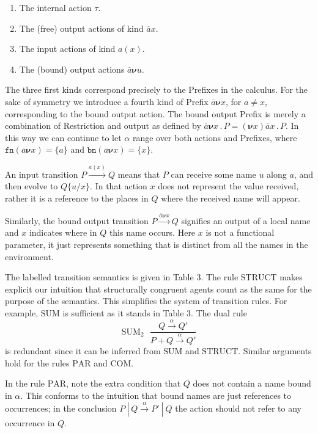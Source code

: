 \documentclass[10pt,a4paper]{article}
\newcommand{\resp}[1]{(\boldsymbol{\nu}#1)}
\newcommand{\res}[2]{\resp{#1}#2}
\newcommand{\outp}[2]{\overline{#1}#2}
\newcommand{\inpp}[2]{#1(#2)}
\newcommand{\silp}{\tau}
\newcommand{\prefix}[2]{{#1}\,.\,#2}
\newcommand{\boutp}[2]{\overline{#1}\boldsymbol{\nu}#2}
\newcommand{\out}[3]{\prefix{\outp{#1}{#2}}{#3}}
\newcommand{\bout}[3]{\prefix{\boutp{#1}{#2}}{#3}}
\newcommand{\para}{\:|\:}
\newcommand{\fn}{\texttt{fn}}
\newcommand{\bn}{\texttt{bn}}
\newcommand{\tran}[3]{#1 \overset{#2}{\longrightarrow} #3}
\newcommand{\rulname}[1]{\scriptstyle \text{#1}}
\newcommand{\rul}[3]{\rulname{#1} \:\:\: \displaystyle \frac{#2}{#3}}
\begin{document}
\begin{enumerate}

\item The internal action $\silp$.

\item The (free) output actions of kind $\outp{a}{x}$.

\item The input actions of kind $\inpp{a}{x}$.

\item The (bound) output actions $\boutp{a}{u}$.
  
\end{enumerate}

The three first kinds correspond precisely to the Prefixes in the calculus. For the sake of symmetry we introduce a fourth kind of Prefix $\boutp{a}{x}$, for $a \neq x$, corresponding to the bound output action. The bound output Prefix is merely a combination of Restriction and output as defined by $\bout{a}{x}{P} = \res{x}{\out{a}{x}{P}}$. In this way we can continue to let $\alpha$ range over both actions and Prefixes, where $\fn(\boutp{a}{x}) = \{a\}$ and $\bn(\boutp{a}{x}) = \{x\}$.

An input transition $\tran{P}{\inpp{a}{x}}{Q}$ means that $P$ can receive some name $u$ along $a$, and then evolve to $Q\{u/x\}$. In that action $x$ does not represent the value received, rather it is a reference to the places in $Q$ where the received name will appear.

Similarly, the bound output transition $\tran{P}{\boutp{a}{x}}{Q}$ signifies an output of a local name and $x$ indicates where in $Q$ this name occurs. Here $x$ is not a functional parameter, it just represents something that is distinct from all the names in the environment.

The labelled transition semantics is given in Table 3. The rule $\rulname{STRUCT}$ makes explicit our intuition that structurally congruent agents count as the same for the purpose of the semantics. This simplifies the system of transition rules. For example, $\rulname{SUM}$ is sufficient as it stands in Table 3. The dual rule
\[
\rul{SUM$_2$}{\tran{Q}{\alpha}{Q'}}{\tran{P + Q}{\alpha}{Q'}}
\]
is redundant since it can be inferred from $\rulname{SUM}$ and $\rulname{STRUCT}$. Similar arguments hold for the rules $\rulname{PAR}$ and $\rulname{COM}$.

In the rule $\rulname{PAR}$, note the extra condition that $Q$ does not contain a name bound in $\alpha$. This conforms to the intuition that bound names are just references to occurrences; in the conclusion $\tran{P \para Q}{\alpha}{P' \para Q}$ the action should not refer to any occurrence in $Q$. 
\end{document}
